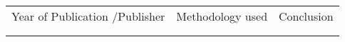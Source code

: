 \documentclass{article}
\begin{document}
\begin{table}
 			\centering
\begin{tabular}{p{}p{}p{}}
\multicolumn{1}{p{pagewidth/3}}{Year of Publication /Publisher} & 
\multicolumn{1}{p{pagewidth/3}}{Methodology used} & 
\multicolumn{1}{p{pagewidth/3}}{Conclusion } \\
\hhline{~~~~~}
\multicolumn{1}{p{pagewidth/3}}{} & 
\multicolumn{1}{p{pagewidth/3}}{} & 
\multicolumn{1}{p{pagewidth/3}}{} \\
\hhline{~~~~~}


\end{tabular}
 \end{table}
\end{document}
